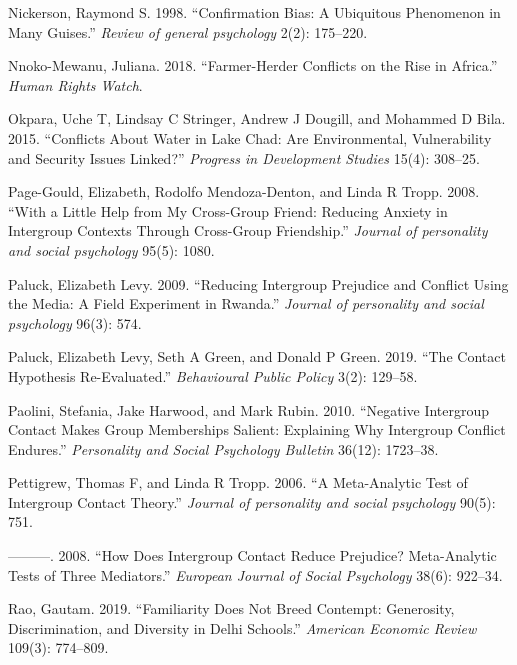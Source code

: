 \documentclass[11pt]{article}
\begin{document}
\leavevmode\hypertarget{ref-nickerson1998confirmation}{}%
Nickerson, Raymond S. 1998. ``Confirmation Bias: A Ubiquitous Phenomenon
in Many Guises.'' \emph{Review of general psychology} 2(2): 175--220.

\leavevmode\hypertarget{ref-hrc2018farmer}{}%
Nnoko-Mewanu, Juliana. 2018. ``Farmer-Herder Conflicts on the Rise in
Africa.'' \emph{Human Rights Watch}.

\leavevmode\hypertarget{ref-okpara2015conflicts}{}%
Okpara, Uche T, Lindsay C Stringer, Andrew J Dougill, and Mohammed D
Bila. 2015. ``Conflicts About Water in Lake Chad: Are Environmental,
Vulnerability and Security Issues Linked?'' \emph{Progress in
Development Studies} 15(4): 308--25.

\leavevmode\hypertarget{ref-page2008little}{}%
Page-Gould, Elizabeth, Rodolfo Mendoza-Denton, and Linda R Tropp. 2008.
``With a Little Help from My Cross-Group Friend: Reducing Anxiety in
Intergroup Contexts Through Cross-Group Friendship.'' \emph{Journal of
personality and social psychology} 95(5): 1080.

\leavevmode\hypertarget{ref-paluck2009jsp}{}%
Paluck, Elizabeth Levy. 2009. ``Reducing Intergroup Prejudice and
Conflict Using the Media: A Field Experiment in Rwanda.'' \emph{Journal
of personality and social psychology} 96(3): 574.

\leavevmode\hypertarget{ref-paluck2019contact}{}%
Paluck, Elizabeth Levy, Seth A Green, and Donald P Green. 2019. ``The
Contact Hypothesis Re-Evaluated.'' \emph{Behavioural Public Policy}
3(2): 129--58.

\leavevmode\hypertarget{ref-paolini2010negative}{}%
Paolini, Stefania, Jake Harwood, and Mark Rubin. 2010. ``Negative
Intergroup Contact Makes Group Memberships Salient: Explaining Why
Intergroup Conflict Endures.'' \emph{Personality and Social Psychology
Bulletin} 36(12): 1723--38.

\leavevmode\hypertarget{ref-pettigrew2006meta}{}%
Pettigrew, Thomas F, and Linda R Tropp. 2006. ``A Meta-Analytic Test of
Intergroup Contact Theory.'' \emph{Journal of personality and social
psychology} 90(5): 751.

\leavevmode\hypertarget{ref-pettigrew2008does}{}%
---------. 2008. ``How Does Intergroup Contact Reduce Prejudice?
Meta-Analytic Tests of Three Mediators.'' \emph{European Journal of
Social Psychology} 38(6): 922--34.

\leavevmode\hypertarget{ref-rao2019familiarity}{}%
Rao, Gautam. 2019. ``Familiarity Does Not Breed Contempt: Generosity,
Discrimination, and Diversity in Delhi Schools.'' \emph{American
Economic Review} 109(3): 774--809.
\end{document}
